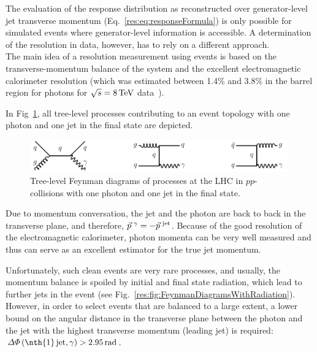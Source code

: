 The evaluation of the response distribution as reconstructed over generator-level jet transverse momentum (Eq.~\eqref{res:eq:responseFormula})
is only possible for simulated events where generator-level information is accessible. 
A determination of the resolution in data, however, has to rely on a different approach.\\



The main idea of a resolution measurement using \GAMJET events is based on the transverse-momentum balance of the \GAMJET system and the excellent electromagnetic calorimeter resolution
(which was estimated between 1.4\% and 3.8\% in the barrel region for photons for $\sqrt{s}=8\,\text{Te}\kern-0.06667em\text{V}$ data~\cite{bib:CMS:PhotonIdentification_8TeV}).

In Fig~\ref{res:fig:FeynmanDiagrams}, all tree-level processes contributing to an event topology with one photon and one jet in the final state are depicted. 
\begin{figure}[b]
  \centering
      \includegraphics[width=0.99\textwidth]{figures/resolution/generalApproach/FeynmanDiagram.pdf}
  \caption{Tree-level Feynman diagrams of processes at the LHC in $pp$-collisions with one photon and one jet in the final state.}  
  \label{res:fig:FeynmanDiagrams}
\end{figure}
Due to momentum conversation, the jet and the photon are back to back in the transverse plane, and therefore, $\vec{p}^{\,\,\gamma} = -\vec{p}^{\,\,\text{jet}}$. 
Because of the good resolution of the electromagnetic calorimeter, photon momenta can be very well measured 
and thus can serve as an excellent estimator for the true jet momentum.


Unfortunately, such clean events are very rare processes, and usually, the momentum balance is spoiled by initial and final state radiation, which lead to further jets in the event 
(see Fig.~\ref{res:fig:FeynmanDiagramsWithRadiation}). 
However, in order to select events that are balanced to a large extent, a lower bound 
on the angular distance in the transverse plane between the photon and the jet with the highest transverse momentum (leading jet) is required: $\Delta\Phi \left(\text{\nth{1}\,jet,\,} \gamma \right)>2.95\,\unit{rad}$. 


